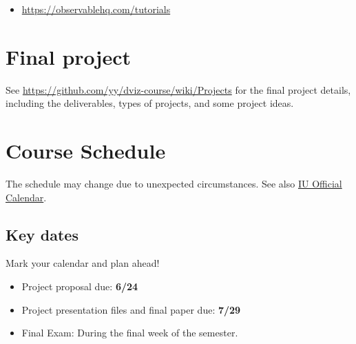 \documentclass[11pt,article,oneside]{memoir} %
\begin{document}
\begin{itemize}
    \item \url{https://observablehq.com/tutorials}
\end{itemize}



\section{Final project}%

See \url{https://github.com/yy/dviz-course/wiki/Projects} for the final project details, including the deliverables, types of projects, and some project ideas. 


\section{Course Schedule}%

The schedule may change due to unexpected circumstances. See also \href{https://registrar.indiana.edu/official-calendar/index.shtml}{IU Official Calendar}. 

\subsection{Key dates}\label{sub:key_dates} %

Mark your calendar and plan ahead!

\begin{itemize}%
\item Project proposal due: \textbf{6/24}
\item Project presentation files and final paper due: \textbf{7/29}
\item Final Exam: During the final week of the semester.
\end{itemize} %


%
\end{document}

